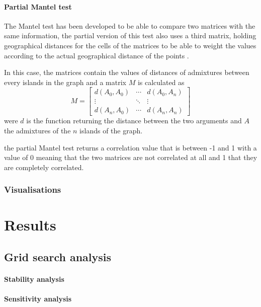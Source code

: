 \documentclass[a4paper,12pt]{report}
\begin{document}
\subsubsection{Partial Mantel test}
The Mantel test has been developed to be able to compare two matrices with the same information, the partial version of this test also uses a third matrix, holding geographical distances for the cells of the matrices to be able to weight the values according to the actual geographical distance of the points \cite{Smo01}.

In this case, the matrices contain the values of distances of admixtures between every islands in the graph and a matrix $M$ is calculated as
\begin{equation}
	M = \begin{bmatrix}
		d(A_0, A_0)	& \cdots & d(A_0, A_n) 	\\
		\vdots		& \ddots & \vdots		\\
		d(A_n, A_0) & \cdots & d(A_n, A_n)
	\end{bmatrix}
\end{equation}
were $d$ is the function returning the distance between the two arguments and $A$ the admixtures of the $n$ islands of the graph.

the partial Mantel test returns a correlation value that is between -1 and 1 with a value of 0 meaning that the two matrices are not correlated at all and 1 that they are completely correlated.

\subsection{Visualisations}




\chapter{Results}
\section{Grid search analysis}

\subsubsection{Stability analysis}


\subsubsection{Sensitivity analysis}
\end{document}
